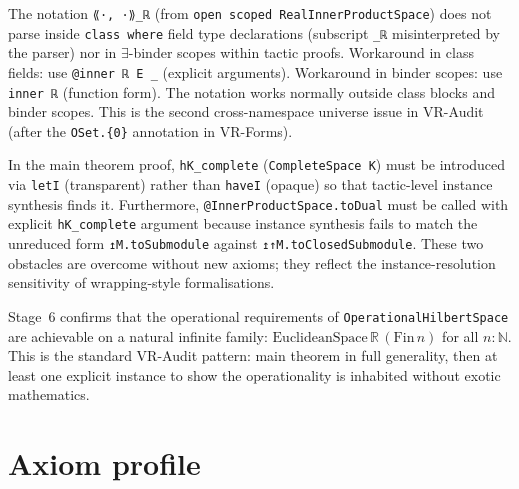 \begin{remark}
\label{rem:audit_obs8}
\leanok
{}
The notation \texttt{⟪·, ·⟫\_ℝ} (from \texttt{open scoped
RealInnerProductSpace}) does not parse inside \texttt{class where} field
type declarations (subscript \texttt{\_ℝ} misinterpreted by the parser)
nor in $\exists$-binder scopes within tactic proofs.  Workaround in
class fields: use \texttt{@inner ℝ E \_} (explicit arguments).
Workaround in binder scopes: use \texttt{inner ℝ} (function form).
The notation works normally outside class blocks and binder scopes.
This is the second cross-namespace universe issue in VR-Audit (after
the \texttt{OSet.\{0\}} annotation in VR-Forms).
\end{remark}

\begin{remark}
\label{rem:audit_obs9}
\leanok
{}
In the main theorem proof, \texttt{hK\_complete} (\texttt{CompleteSpace
K}) must be introduced via \texttt{letI} (transparent) rather than
\texttt{haveI} (opaque) so that tactic-level instance synthesis finds it.
Furthermore, \texttt{@InnerProductSpace.toDual} must be called with
explicit \texttt{hK\_complete} argument because instance synthesis fails
to match the unreduced form \texttt{↥M.toSubmodule} against
\texttt{↥↑M.toClosedSubmodule}.  These two obstacles are overcome without
new axioms; they reflect the instance-resolution sensitivity of
wrapping-style formalisations.
\end{remark}

\begin{remark}
\label{rem:audit_obs10}
\leanok
{}
Stage~6 confirms that the operational requirements of
\texttt{OperationalHilbertSpace} are achievable on a natural infinite
family: $\mathrm{EuclideanSpace}\,\mathbb{R}\,(\mathrm{Fin}\,n)$ for all
$n : \mathbb{N}$.  This is the standard VR-Audit pattern: main theorem
in full generality, then at least one explicit instance to show the
operationality is inhabited without exotic mathematics.
\end{remark}

\section{Axiom profile}
\label{sec:audit_axiom_profile}


